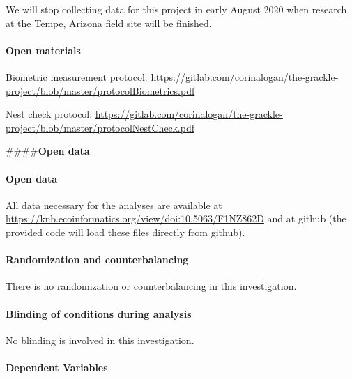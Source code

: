 \documentclass[
]{article}
\begin{document}
We will stop collecting data for this project in early August 2020 when
research at the Tempe, Arizona field site will be finished.

\hypertarget{open-materials}{%
\paragraph{\texorpdfstring{\textbf{Open
materials}}{Open materials}}\label{open-materials}}

Biometric measurement protocol:
\url{https://gitlab.com/corinalogan/the-grackle-project/blob/master/protocolBiometrics.pdf}

Nest check protocol:
\url{https://gitlab.com/corinalogan/the-grackle-project/blob/master/protocolNestCheck.pdf}

\#\#\#\#\textbf{Open data}

\hypertarget{open-data}{%
\paragraph{Open data}\label{open-data}}

All data necessary for the analyses are available at
\url{https://knb.ecoinformatics.org/view/doi:10.5063/F1NZ862D} and at
github (the provided code will load these files directly from github).

\hypertarget{randomization-and-counterbalancing}{%
\paragraph{\texorpdfstring{\textbf{Randomization and
counterbalancing}}{Randomization and counterbalancing}}\label{randomization-and-counterbalancing}}

There is no randomization or counterbalancing in this investigation.

\hypertarget{blinding-of-conditions-during-analysis}{%
\paragraph{\texorpdfstring{\textbf{Blinding of conditions during
analysis}}{Blinding of conditions during analysis}}\label{blinding-of-conditions-during-analysis}}

No blinding is involved in this investigation.

\hypertarget{dependent-variables}{%
\paragraph{\texorpdfstring{\textbf{Dependent
Variables}}{Dependent Variables}}\label{dependent-variables}}
\end{document}
